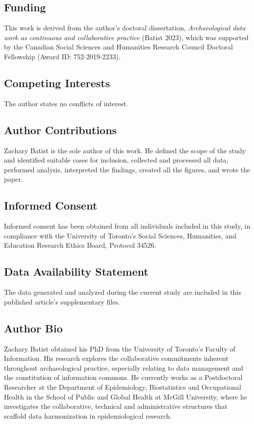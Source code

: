 \documentclass[
  canadian,
]{article}
\begin{document}
\subsection{Funding}\label{funding}

This work is derived from the author's doctoral dissertation,
\emph{Archaeological data work as continuous and collaborative practice}
(Batist 2023), which was supported by the Canadian Social Sciences and
Humanities Research Council Doctoral Fellowship (Award ID:
752-2019-2233).

\subsection{Competing Interests}\label{competing-interests}

The author states no conflicts of interest.

\subsection{Author Contributions}\label{author-contributions}

Zachary Batist is the sole author of this work. He defined the scope of
the study and identified suitable cases for inclusion, collected and
processed all data, performed analysis, interpreted the findings,
created all the figures, and wrote the paper.

\subsection{Informed Consent}\label{informed-consent}

Informed consent has been obtained from all individuals included in this
study, in compliance with the University of Toronto's Social Sciences,
Humanities, and Education Research Ethics Board, Protocol 34526.

\subsection{Data Availability
Statement}\label{data-availability-statement}

The data generated and analyzed during the current study are included in
this published article's supplementary files.

\subsection{Author Bio}\label{author-bio}

Zachary Batist obtained his PhD from the University of Toronto's Faculty
of Information. His research explores the collaborative commitments
inherent throughout archaeological practice, especially relating to data
management and the constitution of information commons. He currently
works as a Postdoctoral Researcher at the Department of Epidemiology,
Biostatistics and Occupational Health in the School of Public and Global
Health at McGill University, where he investigates the collaborative,
technical and administrative structures that scaffold data harmonization
in epidemiological research.
\end{document}

